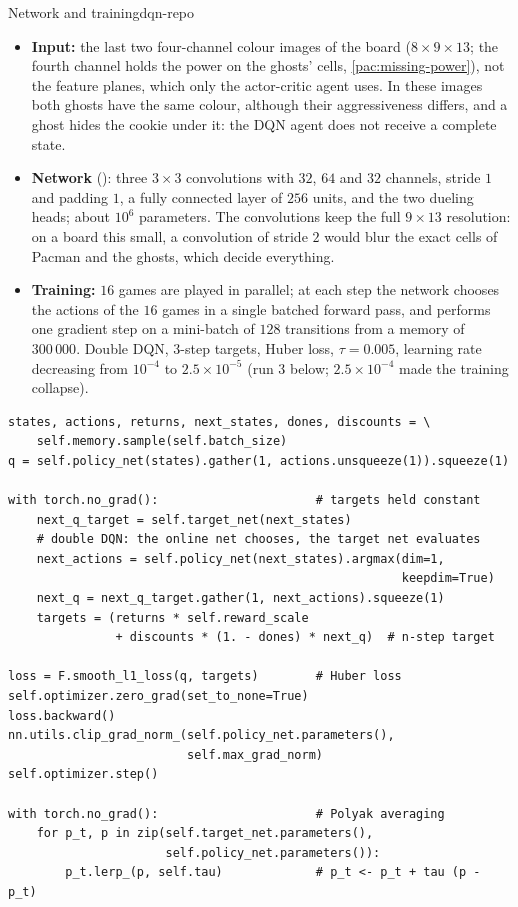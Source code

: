 \begin{pacman}{Network and training}{dqn-repo}
  \begin{itemize}[nosep]
    \item \textbf{Input:} the last two four-channel colour images of
      the board ($8 \times 9 \times 13$; the fourth channel holds the
      power on the ghosts' cells, \cref{pac:missing-power}), not the
      feature planes, which only the actor-critic agent uses. In these
      images both ghosts have the same colour, although their
      aggressiveness differs, and a ghost hides the cookie under it: the
      DQN agent does not receive a complete state.
    \item \textbf{Network} (): three $3 \times 3$
      convolutions with $32$, $64$ and $32$ channels, stride $1$ and
      padding $1$, a fully connected layer of $256$ units, and the two
      dueling heads; about $10^6$ parameters. The convolutions keep the full
      $9 \times 13$ resolution: on a board this small, a convolution of
      stride $2$ would blur the exact cells of Pacman and the ghosts, which
      decide everything.
    \item \textbf{Training:} $16$ games are played in parallel; at each step
      the network chooses the actions of the $16$ games in a single batched
      forward pass, and performs one gradient step on a mini-batch of $128$
      transitions from a memory of $300\,000$. Double DQN, $3$-step targets,
      Huber loss, $\tau = 0.005$, learning rate decreasing from $10^{-4}$
      to $2.5 \times 10^{-5}$ (run 3 below; $2.5 \times 10^{-4}$ made the
      training collapse).
  \end{itemize}
\end{pacman}

\begin{lstlisting}[caption={One DQN update (\code{algorithms.py},
  \code{DQN.learn}, excerpt)}]
states, actions, returns, next_states, dones, discounts = \
    self.memory.sample(self.batch_size)
q = self.policy_net(states).gather(1, actions.unsqueeze(1)).squeeze(1)

with torch.no_grad():                      # targets held constant
    next_q_target = self.target_net(next_states)
    # double DQN: the online net chooses, the target net evaluates
    next_actions = self.policy_net(next_states).argmax(dim=1,
                                                       keepdim=True)
    next_q = next_q_target.gather(1, next_actions).squeeze(1)
    targets = (returns * self.reward_scale
               + discounts * (1. - dones) * next_q)  # n-step target

loss = F.smooth_l1_loss(q, targets)        # Huber loss
self.optimizer.zero_grad(set_to_none=True)
loss.backward()
nn.utils.clip_grad_norm_(self.policy_net.parameters(),
                         self.max_grad_norm)
self.optimizer.step()

with torch.no_grad():                      # Polyak averaging
    for p_t, p in zip(self.target_net.parameters(),
                      self.policy_net.parameters()):
        p_t.lerp_(p, self.tau)             # p_t <- p_t + tau (p - p_t)
\end{lstlisting}


